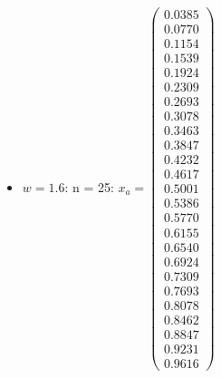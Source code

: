 \documentclass{udpreport}
\begin{document}
\begin{enumerate}
\begin{enumerate}
{{{{\begin{itemize}
\begin{itemize}
				\item $w = 1.6$:	
				n = 25: $x_{a} = \left(\begin{array}{c} 0.0385\\ 0.0770\\ 0.1154\\ 0.1539\\ 0.1924\\ 0.2309\\ 0.2693\\ 0.3078\\ 0.3463\\ 0.3847\\ 0.4232\\ 0.4617\\ 0.5001\\ 0.5386\\ 0.5770\\ 0.6155\\ 0.6540\\ 0.6924\\ 0.7309\\ 0.7693\\ 0.8078\\ 0.8462\\ 0.8847\\ 0.9231\\ 0.9616 \end{array}\right)$
				

\end{itemize}
\end{itemize}}}}}
\end{enumerate}
\end{enumerate}
\end{document}
